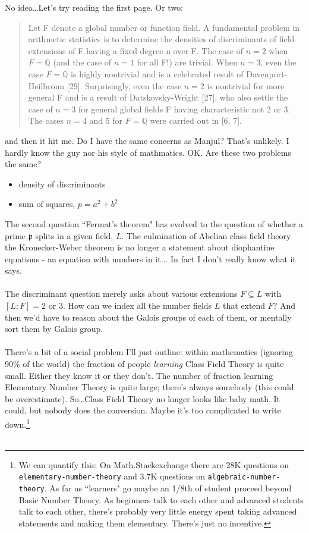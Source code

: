 \documentclass[12pt]{article}
\begin{document}
No idea\dots Let's try reading the first page.  Or two: 
\begin{quotation}
Let F denote a global number or function field. A fundamental problem in arithmetic statistics
is to determine the densities of discriminants of field extensions of F having a fixed degree n over F.
The case of $n = 2$ when $F = \mathbb{Q}$ (and the case of $n = 1$ for all F!) are trivial. When $n = 3$, even the
case $F = \mathbb{Q}$ is highly nontrivial and is a celebrated result of Davenport-Heilbronn [29]. Surprisingly,
even the case $n = 2$ is nontrivial for more general F and is a result of Datskovsky-Wright [27], who
also settle the case of $n = 3$ for general global fields F having characteristic not 2 or 3. The cases $n = 4$
and 5 for $F = \mathbb{Q}$ were carried out in [6, 7].
\end{quotation}
and then it hit me.  Do I have the same concerns as Manjul?  That's unlikely.  I hardly know the guy nor his style of mathmatics.  OK.  Are these two problems the same?
\begin{itemize}
\item density of discriminants 
\item sum of squares, $p = a^2 + b^2$
\end{itemize}
The second question ``Fermat's theorem" has evolved to the question of whether a prime $\mathfrak{p}$ splits in a given field, $L$.  The culmination of Abelian class field theory the Kronecker-Weber theorem is no longer a statement about diophantine equations - an equation with numbers in it... In fact I don't really know what it says. \\ \\ 
The discriminant question merely asks about various extensions $F \subseteq L$ with $[L:F] = 2 \text{ or } 3$.  How can we index all the number fields $L$ that extend $F$?  And then we'd have to reason about the Galois groups of each of them, or mentally sort them by Galois group.\\ \\
There's a bit of a social problem I'll just outline: within mathematics (ignoring 90\% of the world) the fraction of people \textit{learning} Class Field Theory is quite small.  Either they know it or they don't.  The number of fraction learning Elementary Number Theory is quite large; there's always somebody (this could be overestimate).  So\dots Class Field Theory no longer looks like baby math.  It could, but nobody does the conversion.  Maybe it's too complicated to write down.\footnote{We can quantify this: On Math.Stackexchange there are 28K questions on \texttt{elementary-number-theory} and 3.7K questions on \texttt{algebraic-number-theory}.  As far as ``learners" go maybe an 1/8th of student proceed beyond Basic Number Theory.  As beginners talk to each other and advanced students talk to each other, there's probably very little energy spent taking advanced statements and making them elementary.  There's just no incentive. } \\ \\
\end{document}

